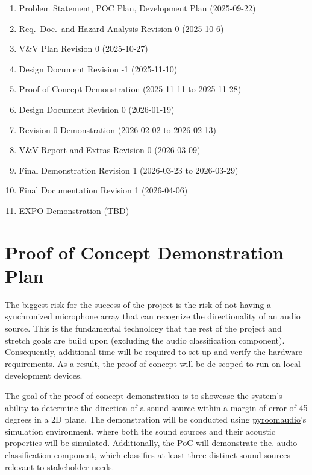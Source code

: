 \documentclass{article}
\begin{document}
\begin{enumerate}
  \item Problem Statement, POC Plan, Development Plan (2025-09-22)
  \item Req.\ Doc.\ and Hazard Analysis Revision 0 (2025-10-6)
  \item V\&V Plan Revision 0 (2025-10-27)
  \item Design Document Revision -1 (2025-11-10)
  \item Proof of Concept Demonstration (2025-11-11 to 2025-11-28)
  \item Design Document Revision 0 (2026-01-19)
  \item Revision 0 Demonstration (2026-02-02 to 2026-02-13)
  \item V\&V Report and Extras Revision 0 (2026-03-09)
  \item Final Demonstration Revision 1 (2026-03-23 to 2026-03-29)
  \item Final Documentation Revision 1 (2026-04-06)
  \item EXPO Demonstration (TBD)
\end{enumerate}

\section{Proof of Concept Demonstration Plan}

The biggest risk for the success of the project is the risk of not having a
synchronized microphone array that can recognize the directionality of an audio
source. This is the fundamental technology that the rest of the project and
stretch goals are build upon (excluding the audio classification component).
Consequently, additional time will be required to set up and verify the hardware
requirements. As a result, the proof of concept will be de-scoped to run
on local development devices.

The goal of the proof of concept demonstration is to showcase the system's
ability to determine the direction of a sound source within a margin of error of
45 degrees in a 2D plane. The demonstration will be conducted using 
\href{https://pypi.org/project/pyroomacoustics/}{pyroomaudio}'s
simulation environment, where both the sound sources and their acoustic
properties will be simulated. Additionally, the PoC will demonstrate the.
\hyperlink{audio_classification_component}{audio classification component},
which classifies at least three distinct sound sources relevant to stakeholder
needs.
\end{document}
